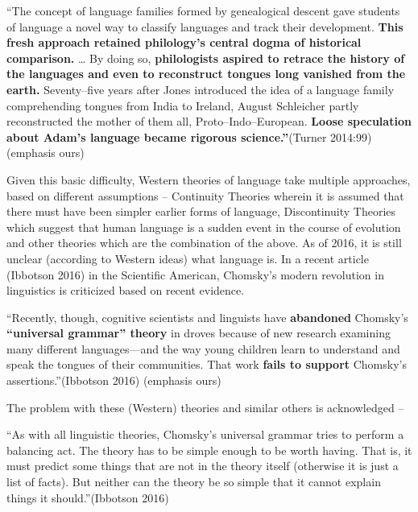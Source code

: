 \begin{myquote}
“The concept of language families formed by genealogical descent gave students of language a novel way to classify languages and track their development. \textbf{This fresh approach retained philology’s central dogma of historical comparison.} … By doing so, \textbf{philologists aspired to retrace the history of the languages and even to reconstruct tongues long vanished from the earth.} Seventy–five years after Jones introduced the idea of a language family comprehending tongues from India to Ireland, August Schleicher partly reconstructed the mother of them all, Proto–Indo–European. \textbf{Loose speculation about Adam’s language became rigorous science.”}\hfill (Turner 2014:99) (emphasis ours)
\end{myquote}

Given this basic difficulty, Western theories of language take multiple approaches, based on different assumptions – Continuity Theories wherein it is assumed that there must have been simpler earlier forms of language, Discontinuity Theories which suggest that human language is a sudden event in the course of evolution and other theories which are the combination of the above. As of 2016, it is still unclear (according to Western ideas) what language is. In a recent article (Ibbotson 2016) in the Scientific American, Chomsky’s modern revolution in linguistics is criticized based on recent evidence.

\begin{myquote}
“Recently, though, cognitive scientists and linguists have \textbf{abandoned } Chomsky’s \textbf{“universal grammar” theory} in droves because of new research examining many different languages—and the way young children learn to understand and speak the tongues of their communities. That work \textbf{fails to support} Chomsky’s assertions.”\hfill (Ibbotson 2016) (emphasis ours)
\end{myquote}

The problem with these (Western) theories and similar others is acknowledged –

\begin{myquote}
“As with all linguistic theories, Chomsky’s universal grammar tries to perform a balancing act. The theory has to be simple enough to be worth having. That is, it must predict some things that are not in the theory itself (otherwise it is just a list of facts). But neither can the theory be so simple that it cannot explain things it should.”\hfill (Ibbotson 2016)
\end{myquote}

